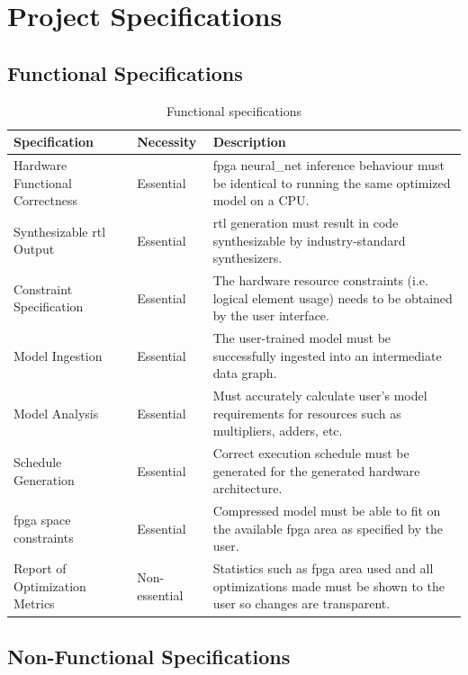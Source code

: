 \documentclass{uw-ece-wkrpt}
\begin{document}
\section{Project Specifications}

\subsection{Functional Specifications}

\begin{table}[H]
\centering
\caption{Functional specifications}\label{tab:func_specs}
\begin{tabularx}{\textwidth}{llX}
\toprule
Specification & Necessity & Description \\
\midrule
Hardware Functional Correctness & Essential & \gls{fpga} \gls{neural_net} inference behaviour must be identical to running the same optimized model on a CPU. \\
Synthesizable \gls{rtl} Output & Essential & \gls{rtl} generation must result in code synthesizable by industry-standard synthesizers. \\
Constraint Specification & Essential & The hardware resource constraints (i.e. logical element usage) needs to be obtained by the user interface. \\
Model Ingestion & Essential & The user-trained model must be successfully ingested into an intermediate data graph. \\
Model Analysis & Essential & Must accurately calculate user's model requirements for resources such as multipliers, adders, etc. \\
Schedule Generation & Essential & Correct execution schedule must be generated for the generated hardware architecture. \\
\gls{fpga} space constraints & Essential & Compressed model must be able to fit on the available \gls{fpga} area as specified by the user. \\
Report of Optimization Metrics & Non-essential & Statistics such as \gls{fpga} area used and all optimizations made must be shown to the user so changes are transparent. \\
\bottomrule
\end{tabularx}
\end{table}

\subsection{Non-Functional Specifications}
\end{document}
